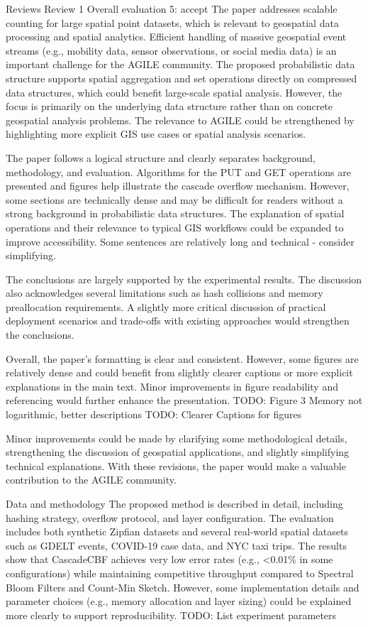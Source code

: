 Reviews
Review 1
Overall evaluation	
5: accept
The paper addresses scalable counting for large spatial point datasets, which is relevant to geospatial data processing and spatial analytics. Efficient handling of massive geospatial event streams (e.g., mobility data, sensor observations, or social media data) is an important challenge for the AGILE community. The proposed probabilistic data structure supports spatial aggregation and set operations directly on compressed data structures, which could benefit large-scale spatial analysis. However, the focus is primarily on the underlying data structure rather than on concrete geospatial analysis problems. The relevance to AGILE could be strengthened by highlighting more explicit GIS use cases or spatial analysis scenarios.

The paper follows a logical structure and clearly separates background, methodology, and evaluation. Algorithms for the PUT and GET operations are presented and figures help illustrate the cascade overflow mechanism. However, some sections are technically dense and may be difficult for readers without a strong background in probabilistic data structures. The explanation of spatial operations and their relevance to typical GIS workflows could be expanded to improve accessibility. Some sentences are relatively long and technical - consider simplifying.

The conclusions are largely supported by the experimental results. The discussion also acknowledges several limitations such as hash collisions and memory preallocation requirements. A slightly more critical discussion of practical deployment scenarios and trade-offs with existing approaches would strengthen the conclusions.

Overall, the paper's formatting is clear and consistent. However, some figures are relatively dense and could benefit from slightly clearer captions or more explicit explanations in the main text. Minor improvements in figure readability and referencing would further enhance the presentation.
TODO: Figure 3 Memory not logarithmic, better descriptions
TODO: Clearer Captions for figures

Minor improvements could be made by clarifying some methodological details, strengthening the discussion of geospatial applications, and slightly simplifying technical explanations. With these revisions, the paper would make a valuable contribution to the AGILE community.

Data and methodology	The proposed method is described in detail, including hashing strategy, overflow protocol, and layer configuration. The evaluation includes both synthetic Zipfian datasets and several real-world spatial datasets such as GDELT events, COVID-19 case data, and NYC taxi trips. The results show that CascadeCBF achieves very low error rates (e.g., <0.01\% in some configurations) while maintaining competitive throughput compared to Spectral Bloom Filters and Count-Min Sketch. However, some implementation details and parameter choices (e.g., memory allocation and layer sizing) could be explained more clearly to support reproducibility.
TODO: List experiment parameters

